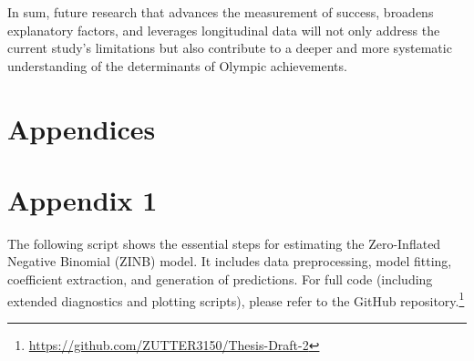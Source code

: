 \documentclass[11pt,twoside]{article}
\numberwithin{Theorem}{section}
\numberwithin{Definition}{section}
\numberwithin{Lemma}{section}
\numberwithin{Algorithm}{section}
\numberwithin{equation}{section}
\begin{document}
In sum, future research that advances the measurement of success, broadens explanatory factors, and leverages longitudinal data will not only address the current study’s limitations but also contribute to a deeper and more systematic understanding of the determinants of Olympic achievements.  





\label{subsec:model_structure}

\appendix
\section*{Appendices}

\section{Appendix 1}
\label{app:one}

The following script shows the essential steps for estimating the Zero-Inflated Negative Binomial (ZINB) model. 
It includes data preprocessing, model fitting, coefficient extraction, and generation of predictions. 
For full code (including extended diagnostics and plotting scripts), please refer to the GitHub repository.\footnote{\url{https://github.com/ZUTTER3150/Thesis-Draft-2}}
\end{document}
